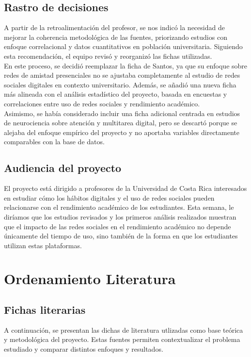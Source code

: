\documentclass[12pt]{article}
\begin{document}
\subsection{Rastro de decisiones}
A partir de la retroalimentación del profesor, se nos indicó la necesidad de mejorar la coherencia metodológica de las fuentes, priorizando estudios con enfoque correlacional y datos cuantitativos en población universitaria. Siguiendo esta recomendación, el equipo revisó y reorganizó las fichas utilizadas.
\\
En este proceso, se decidió reemplazar la ficha de Santos, ya que su enfoque sobre redes de amistad presenciales no se ajustaba completamente al estudio de redes sociales digitales en contexto universitario. Además, se añadió una nueva ficha más alineada con el análisis estadístico del proyecto, basada en encuestas y correlaciones entre uso de redes sociales y rendimiento académico.
\\
Asimismo, se había considerado incluir una ficha adicional centrada en estudios de neurociencia sobre atención y multitarea digital, pero se descartó porque se alejaba del enfoque empírico del proyecto y no aportaba variables directamente comparables con la base de datos.

\subsection{Audiencia del proyecto}
El proyecto está dirigido a profesores de la Universidad de Costa Rica interesados en estudiar cómo los hábitos digitales y el uso de redes sociales pueden relacionarse con el rendimiento académico de los estudiantes. Esta semana, le diríamos que los estudios revisados y los primeros análisis realizados muestran que el impacto de las redes sociales en el rendimiento académico no depende únicamente del tiempo de uso, sino también de la forma en que los estudiantes utilizan estas plataformas.

\section{Ordenamiento Literatura}
\subsection{Fichas literarias}
A continuación, se presentan las dichas de literatura utlizadas como base teórica y metodológica del proyecto. Estas fuentes permiten contextualizar el problema estudiado y comparar distintos enfoques y resultados.
\end{document}
